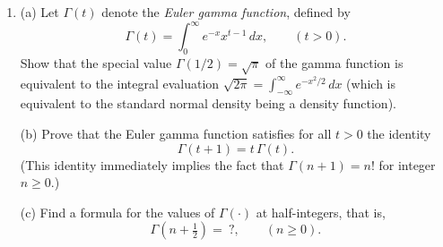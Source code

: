 \documentclass[12pt]{article}
\newcommand{\expec}{\mathbf{E}}
\theoremstyle{example}
\begin{document}
\begin{enumerate}
\medskip\noindent
(e) Optionally, draw (or, at least, imagine) a diagram showing the graphs of the two functions $M(t)$ and $|t-\expec X|$ illustrating schematically  the facts (a)--(d) above.

\medskip\noindent \textbf{Hints.} For (c), assume first (without loss of generality - why?) that $\expec X=0$. Divide the integral into two integrals, on the positive real axis and the negative real axis. For each of the two integrals, by decomposing $|X-t|$ into a sum of its positive and negative parts and using the fact that $\expec X=0$ in a clever way, show that one may replace the integrand $(\expec|X-t|-|t|)$ by a constant multiple of either $\expec(X-t)_+$ or $\expec(X-t)_-$, and proceed from there.

For (d), first, develop your intuition by plotting the function $M(t)$ in a couple of cases, for example when $X\sim \textrm{Binom}(1,1/2)$ and when $X\sim \textrm{Binom}(2,1/2)$. Second, if $t_0<t_1$, plot the graph of the function 
$x\to \frac{|x-t_1|-|x-t_0|}{t_1-t_0}$, and deduce from this a formula for $M'(t_0+)$ and (by considering $t_1<t_0$ instead) a similar formula for $M'(t_0-)$, the right- and left-sided derivatives of $M$ at $t_0$, respectively. On the other hand, think how the condition that $t_0$ is a minimum point of $M(t)$ can be expressed in terms of these one-sided derivatives.



\item (a)
Let $\Gamma(t)$ denote the \emph{Euler gamma function}, defined by
$$\Gamma(t) = \int_0^\infty e^{-x} x^{t-1}\,dx, \qquad (t>0). $$
Show that the special value $\Gamma(1/2)=\sqrt{\pi}$ of the gamma function is equivalent to the integral evaluation $\sqrt{2\pi} = \int_{-\infty}^\infty e^{-x^2/2}\,dx$ (which is equivalent to the standard normal density being a density function).

\medskip \noindent (b) Prove that the Euler gamma function satisfies for all $t>0$ the identity
$$\Gamma(t+1)=t\,\Gamma(t).$$
(This identity immediately implies the fact that $\Gamma(n+1)=n!$ for integer $n\ge 0$.)

\medskip \noindent
(c) Find a formula for the values of $\Gamma(\cdot)$ at half-integers, that is,
$$ \Gamma\left(n+\tfrac12\right) =\ ?, \qquad (n\ge 0). $$



\end{enumerate}
\end{document}

